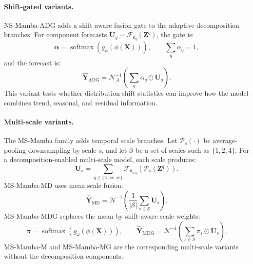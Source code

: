 \paragraph{Shift-gated variants.}
NS-Mamba-ADG adds a shift-aware fusion gate to the adaptive decomposition branches.
For component forecasts $\mathbf{U}_q=\mathcal{F}_{\theta_q}(\mathbf{Z}^q)$, the gate is:
\begin{equation}
    \boldsymbol{\alpha}
    =
    \operatorname{softmax}
    \left(
    g_{\psi}(\phi(\mathbf{X}))
    \right),
    \qquad
    \sum_q \alpha_q = 1,
\end{equation}
and the forecast is:
\begin{equation}
    \hat{\mathbf{Y}}_{\mathrm{ADG}}
    =
    \mathcal{N}_{A}^{-1}
    \left(
    \sum_{q}
    \alpha_q \odot \mathbf{U}_q
    \right).
\end{equation}
This variant tests whether distribution-shift statistics can improve how the model combines trend, seasonal, and residual information.

\paragraph{Multi-scale variants.}
The MS-Mamba family adds temporal scale branches.
Let $\mathcal{P}_{s}(\cdot)$ be average-pooling downsampling by scale $s$, and let $\mathcal{S}$ be a set of scales such as $\{1,2,4\}$.
For a decomposition-enabled multi-scale model, each scale produces:
\begin{equation}
    \mathbf{U}_{s}
    =
    \sum_{q \in \{\mathrm{tr},\mathrm{se},\mathrm{re}\}}
    \mathcal{F}_{\theta_{s,q}}
    \left(
    \mathcal{P}_{s}(\mathbf{Z}^{q})
    \right).
\end{equation}
MS-Mamba-MD uses mean scale fusion:
\begin{equation}
    \hat{\mathbf{Y}}_{\mathrm{MD}}
    =
    \mathcal{N}^{-1}
    \left(
    \frac{1}{|\mathcal{S}|}
    \sum_{s \in \mathcal{S}}
    \mathbf{U}_{s}
    \right).
\end{equation}
MS-Mamba-MDG replaces the mean by shift-aware scale weights:
\begin{equation}
    \boldsymbol{\pi}
    =
    \operatorname{softmax}(g_{\omega}(\phi(\mathbf{X}))),
    \qquad
    \hat{\mathbf{Y}}_{\mathrm{MDG}}
    =
    \mathcal{N}^{-1}
    \left(
    \sum_{s \in \mathcal{S}}
    \pi_s \odot \mathbf{U}_{s}
    \right).
\end{equation}
MS-Mamba-M and MS-Mamba-MG are the corresponding multi-scale variants without the decomposition components.


